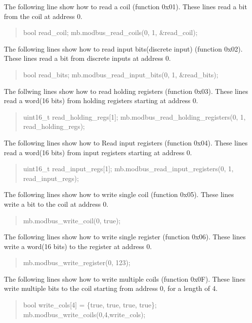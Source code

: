 \begin{DoxyEnumerate}
\item The following line show how to read a coil (function 0x01). These lines read a bit from the coil at address 0. \begin{quote}
bool read\+\_\+coil; mb.\+modbus\+\_\+read\+\_\+coils(0, 1, \&read\+\_\+coil); \end{quote}

\item The following lines show how to read input bits(discrete input) (function 0x02). These lines read a bit from discrete inputs at address 0. \begin{quote}
bool read\+\_\+bits; mb.\+modbus\+\_\+read\+\_\+input\+\_\+bits(0, 1, \&read\+\_\+bits); \end{quote}

\item The follwing lines show how to read holding registers (function 0x03). These lines read a word(16 bits) from holding registers starting at address 0. \begin{quote}
uint16\+\_\+t read\+\_\+holding\+\_\+regs\mbox{[}1\mbox{]}; mb.\+modbus\+\_\+read\+\_\+holding\+\_\+registers(0, 1, read\+\_\+holding\+\_\+regs); \end{quote}

\item The following lines show how to Read input registers (function 0x04). These lines read a word(16 bits) from input registers starting at address 0. \begin{quote}
uint16\+\_\+t read\+\_\+input\+\_\+regs\mbox{[}1\mbox{]}; mb.\+modbus\+\_\+read\+\_\+input\+\_\+registers(0, 1, read\+\_\+input\+\_\+regs); \end{quote}

\item The following lines show how to write single coil (function 0x05). These lines write a bit to the coil at address 0. \begin{quote}
mb.\+modbus\+\_\+write\+\_\+coil(0, true); \end{quote}

\item The following lines show how to write single register (function 0x06). These lines write a word(16 bits) to the register at address 0. \begin{quote}
mb.\+modbus\+\_\+write\+\_\+register(0, 123); \end{quote}

\item The following lines show how to write multiple coils (function 0x0F). These lines write multiple bits to the coil starting from address 0, for a length of 4. \begin{quote}
bool write\+\_\+cols\mbox{[}4\mbox{]} = \{true, true, true, true\}; mb.\+modbus\+\_\+write\+\_\+coils(0,4,write\+\_\+cols); \end{quote}


\end{DoxyEnumerate}

